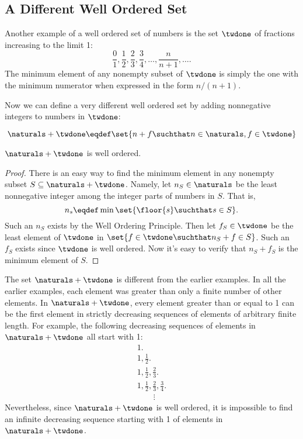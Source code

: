 \subsection{A Different Well Ordered Set}
\begin{optional}
Another example of a well ordered set of numbers is the set $\twdone$ of
fractions increasing to the limit 1:
\[
\frac01, \frac12, \frac23, \frac34, \dots, \frac{n}{n+1}, \dots.
\]
The minimum element of any nonempty subset of $\twdone$ is simply the one
with the minimum numerator when expressed in the form $n/(n+1)$. 

Now we can define a very different well ordered set by adding
nonnegative integers to numbers in $\twdone$:
\begin{definition}\label{n+to1}
\[
\naturals + \twdone \eqdef \set{n + f \suchthat n \in \naturals, f \in
  \twdone}
\]
\end{definition}

\begin{lemma}\label{to1_well-order}
$\naturals + \twdone$ is well ordered.
\end{lemma}

\begin{proof}
There is an easy way to find the minimum element in any nonempty
subset $S \subseteq \naturals + \twdone$.  Namely, let $n_S \in
\naturals$ be the least nonnegative integer among the integer parts of
numbers in $S$.  That is,
\[
n_s \eqdef \min\set{\floor{s} \suchthat s \in S}.
\]
Such an $n_S$ exists by the Well Ordering Principle.  Then let $f_S
\in \twdone$ be the least element of $\twdone$ in $\set{f \in \twdone
  \suchthat n_S+f \in S}$.  Such an $f_S$ exists since $\twdone$ is well
ordered.  Now it's easy to verify that $n_S+f_S$ is the minimum
element of $S$.
\end{proof}

The set $\naturals + \twdone$ is different from the earlier examples.
In all the earlier examples, each element was greater than
only a finite number of other elements.  In $\naturals + \twdone$, every
element greater than or equal to 1 can be the first element in
strictly decreasing sequences of elements of arbitrary finite length.
For example, the following decreasing sequences of elements in
$\naturals + \twdone$ all start with 1:
\[\begin{array}{l}
1.\\
1, \frac12.\\
1, \frac12, \frac23.\\
1, \frac12, \frac23, \frac34.\\
\qquad\vdots
\end{array}\]
Nevertheless, since $\naturals + \twdone$ is well ordered, it is
impossible to find an infinite decreasing sequence starting with 1 of
elements in $\naturals + \twdone$.

\end{optional}

\begin{problems}
  \practiceproblems

  \classproblems

\end{problems}
\endinput


